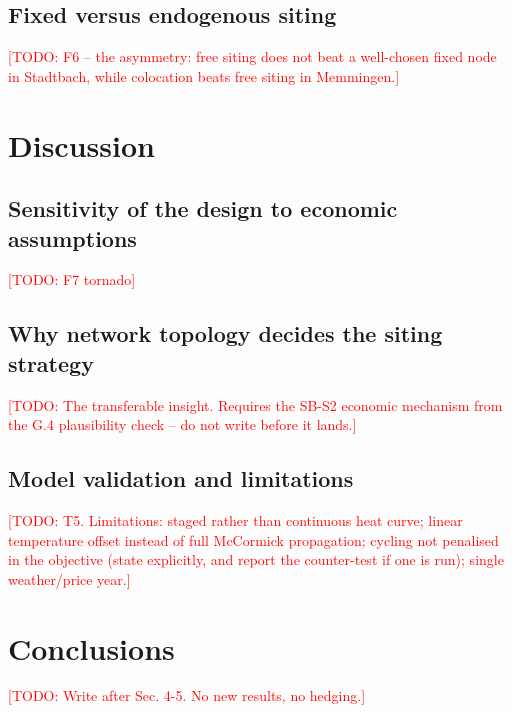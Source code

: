\documentclass[review,3p]{elsarticle}
\newcommand{\todo}[1]{\textcolor{red}{[TODO: #1]}}
\begin{document}
\subsection{Fixed versus endogenous siting}
\label{sec:results:siting}
\todo{F6 -- the asymmetry: free siting does not beat a well-chosen fixed
node in Stadtbach, while colocation beats free siting in Memmingen.}

\section{Discussion}
\label{sec:discussion}
\subsection{Sensitivity of the design to economic assumptions}
\label{sec:discussion:sensitivity}
\todo{F7 tornado}

\subsection{Why network topology decides the siting strategy}
\label{sec:discussion:topology}
\todo{The transferable insight. Requires the SB-S2 economic mechanism
from the G.4 plausibility check -- do not write before it lands.}

\subsection{Model validation and limitations}
\label{sec:discussion:limitations}
\todo{T5. Limitations: staged rather than continuous heat curve;
linear temperature offset instead of full McCormick propagation;
cycling not penalised in the objective (state explicitly, and report
the counter-test if one is run); single weather/price year.}

\section{Conclusions}
\label{sec:conclusions}
\todo{Write after Sec. 4-5. No new results, no hedging.}

\end{document}

